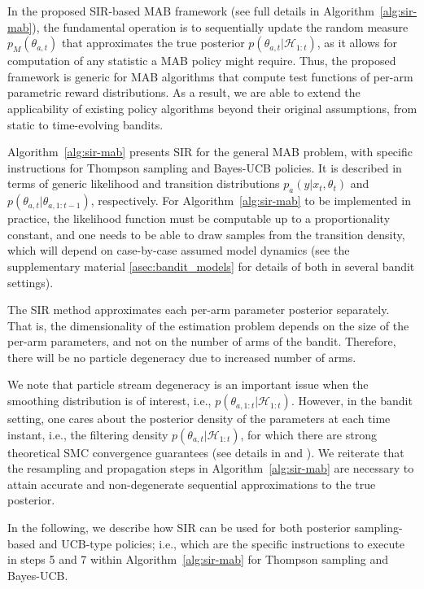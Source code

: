 \documentclass{article}
\newcommand{\HH}{\mathcal{H}}
\newcommand{\ie}{i.e., }
\def\addappendix{}
\begin{document}
In the proposed SIR-based MAB framework (see full details in Algorithm~\ref{alg:sir-mab}), the fundamental operation is to sequentially update the random measure $p_M(\theta_{a,t})$ that approximates the true posterior $p(\theta_{a,t}|\HH_{1:t})$, as it allows for computation of any statistic a MAB policy might require. Thus, the proposed framework is generic for MAB algorithms that compute test functions of per-arm parametric reward distributions. As a result, we are able to extend the applicability of existing policy algorithms beyond their original assumptions, from static to time-evolving bandits.

Algorithm~\ref{alg:sir-mab} presents SIR for the general MAB problem, with specific instructions for Thompson sampling and Bayes-UCB policies. It is described in terms of generic likelihood and transition distributions $p_a(y|x_t,\theta_t)$ and $p(\theta_{a,t}|\theta_{a,1:t-1})$, respectively. For Algorithm~\ref{alg:sir-mab} to be implemented in practice, the likelihood function must be computable up to a proportionality constant, and one needs to be able to draw samples from the transition density, which will depend on case-by-case assumed model dynamics (see
\ifx\addappendix\undefined the supplementary material \else \autoref{asec:bandit_models} \fi for details of both in several bandit settings).

The SIR method approximates each per-arm parameter posterior separately. That is, the dimensionality of the estimation problem depends on the size of the per-arm parameters, and not on the number of arms of the bandit. Therefore, there will be no particle degeneracy due to increased number of arms.

We note that particle stream degeneracy is an important issue when the smoothing distribution is of interest, \ie $p(\theta_{a,1:t}|\HH_{1:t})$. However, in the bandit setting, one cares about the posterior density of the parameters at each time instant, \ie the filtering density $p(\theta_{a,t}|\HH_{1:t})$, for which there are strong theoretical SMC convergence guarantees (see details in \cite{j-Crisan2002} and \cite{j-Chopin2004}). We reiterate that the resampling and propagation steps in Algorithm~\ref{alg:sir-mab} are necessary to attain accurate and non-degenerate sequential approximations to the true posterior.

In the following, we describe how SIR can be used for both posterior sampling-based and UCB-type policies; \ie which are the specific instructions to execute in steps 5 and 7 within Algorithm~\ref{alg:sir-mab} for Thompson sampling and Bayes-UCB.
\end{document}
